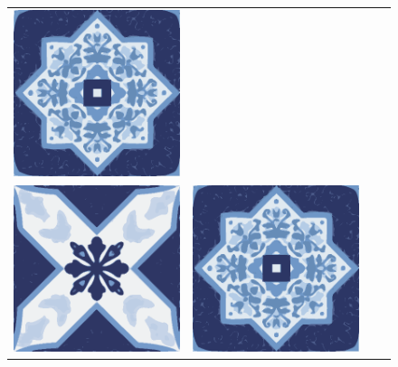 \documentclass{oci}
\begin{document}
\begin{problemDescription}
\begin{figure}[h]
\begin{center}
{\begin{tabular}{cccc}
        \includegraphics[scale=0.3]{a.eps} \\
        \includegraphics[scale=0.3]{b.eps} &
        \includegraphics[scale=0.3]{a.eps} &

\end{tabular}}
\end{center}
\end{figure}
\end{problemDescription}
\end{document}
